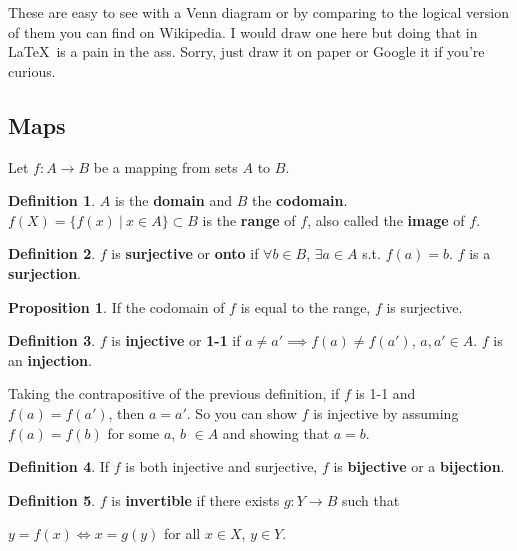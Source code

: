 \documentclass{article}
\theoremstyle{definition}
\newtheorem{definition}{Definition}[section]
\newtheorem{proposition}{Proposition}[section]
\begin{document}
These are easy to see with a Venn diagram or by comparing to the logical version of them you can find on Wikipedia. I would draw one here but doing that in \LaTeX \ is a pain in the ass. Sorry, just draw it on paper or Google it if you're curious.

\subsection{Maps}

Let $f: A \rightarrow B$ be a mapping from sets $A$ to $B$.

\begin{definition}
$A$ is the \textbf{domain} and $B$ the \textbf{codomain}. $f(X) = \{f(x) \ | \ x \in A\} \subset B$ is the \textbf{range} of $f$, also called the \textbf{image} of $f$.
\end{definition}

\begin{definition}
$f$ is \textbf{surjective} or \textbf{onto} if $\forall b \in B$, $\exists a \in A$ s.t. $f(a) = b$. $f$ is a \textbf{surjection}.
\end{definition}

\begin{proposition}
If the codomain of $f$ is equal to the range, $f$ is surjective.
\end{proposition}

\begin{definition}
$f$ is \textbf{injective} or \textbf{1-1} if $a \neq a' \implies f(a) \neq f(a')$, $a, a' \in A$. $f$ is an \textbf{injection}.
\end{definition}

Taking the contrapositive of the previous definition, if $f$ is 1-1 and $f(a) = f(a')$, then $a = a'$. So you can show $f$ is injective by assuming $f(a) = f(b)$ for some $a$, $b$ $\in A$ and showing that $a = b$.

\begin{definition}
If $f$ is both injective and surjective, $f$ is \textbf{bijective} or a \textbf{bijection}.
\end{definition}

\begin{definition}
$f$ is \textbf{invertible} if there exists $g: Y \rightarrow B$ such that 

\begin{center}
$y = f(x) \iff x = g(y)$ for all $x \in X$, $y \in Y$.
\end{center}

\end{definition}
\end{document}
